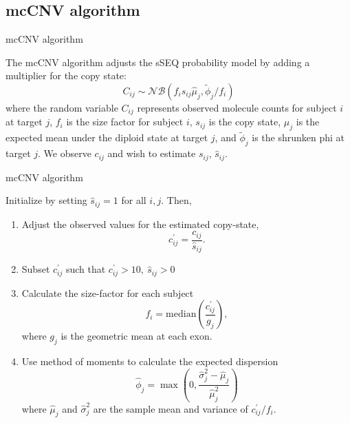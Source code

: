 \documentclass[
  10pt,
  ignorenonframetext,
  m]{beamer}
\begin{document}
\hypertarget{mccnv-algorithm-1}{%
\subsection{mcCNV algorithm}\label{mccnv-algorithm-1}}

\begin{frame}{mcCNV algorithm}

The mcCNV algorithm adjusts the sSEQ probability model by adding a
multiplier for the copy state: \[
  C_{ij} \sim \mathcal{NB}(f_is_{ij}\hat\mu_j, \tilde\phi_j/f_i)
\] where the random variable \(C_{ij}\) represents observed molecule
counts for subject \(i\) at target \(j\), \(f_i\) is the size factor for
subject \(i\), \(s_{ij}\) is the copy state, \(\mu_j\) is the expected
mean under the diploid state at target \(j\), and \(\tilde\phi_j\) is
the shrunken phi at target \(j\). We observe \(c_{ij}\) and wish to
estimate \(s_{ij}\), \(\hat{s}_{ij}\).

\end{frame}

\begin{frame}{mcCNV algorithm}
\protect\hypertarget{mccnv-algorithm-2}{}

Initialize by setting \(\hat{s}_{ij} = 1\) for all \(i,j\). Then,

\begin{enumerate}
\item
  Adjust the observed values for the estimated copy-state, \[
    c_{ij}^{\prime} = \frac{c_{ij}}{\hat{s}_{ij}}.
    \]
\item
  Subset \(c_{ij}^{\prime}\) such that
  \(c_{ij}^{\prime} > 10, ~ \hat{s}_{ij} > 0\)
\item
  Calculate the size-factor for each subject \[
    f_i = \text{median}\left(\frac{c_{ij}^{\prime}}{g_j}\right),
    \] where \(g_j\) is the geometric mean at each exon.
\item
  Use method of moments to calculate the expected dispersion \[
    \hat\phi_j = \max\left(0, \frac{\hat\sigma_j^2 - \hat{\mu}_j}{\hat{\mu}_j^2}\right)
    \] where \(\hat{\mu}_j\) and \(\hat{\sigma}_j^2\) are the sample
  mean and variance of \(c_{ij}^{\prime}/f_i\).
\end{enumerate}

\end{frame}
\end{document}
